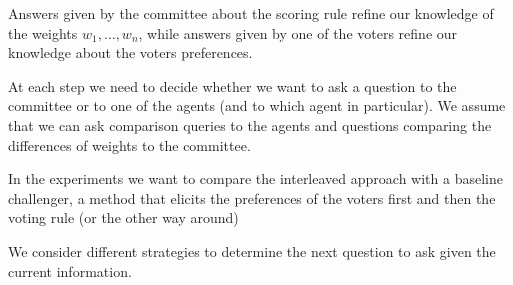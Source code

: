 \documentclass[12pt]{article}
\newcommand{\pprofile}{\textbf{p}}%
\newcommand{\w}{\textbf{w}}%
\begin{document}
Answers given by the committee about the scoring rule refine our knowledge of the weights $w_1,\ldots,w_n$, while
answers given by one of the voters refine our knowledge about the voters preferences.

At each step we need to decide whether we want to ask a question to the committee or to one of the agents (and to which agent in particular). We assume that we can ask comparison queries to the agents and questions comparing the differences of weights to the committee. 

In the experiments we want to compare the interleaved approach with a baseline challenger, a method  that elicits the preferences of the voters first and then the voting rule (or the other way around)


We consider different strategies to determine the next question to ask given the current information.

\end{document}
